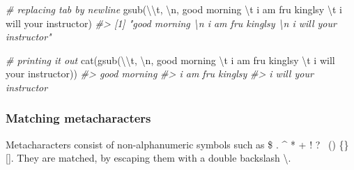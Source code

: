 \documentclass[
]{book}
\newenvironment{Shaded}{\begin{snugshade}}{\end{snugshade}}
\newcommand{\CommentTok}[1]{\textcolor[rgb]{0.56,0.35,0.01}{\textit{#1}}}
\newcommand{\FunctionTok}[1]{\textcolor[rgb]{0.00,0.00,0.00}{#1}}
\newcommand{\NormalTok}[1]{#1}
\newcommand{\SpecialCharTok}[1]{\textcolor[rgb]{0.00,0.00,0.00}{#1}}
\newcommand{\StringTok}[1]{\textcolor[rgb]{0.31,0.60,0.02}{#1}}
\begin{document}
\begin{Shaded}
\begin{Highlighting}[]
\CommentTok{\# replacing tab by newline}
\FunctionTok{gsub}\NormalTok{(}\StringTok{\textquotesingle{}}\SpecialCharTok{\textbackslash{}\textbackslash{}}\StringTok{t\textquotesingle{}}\NormalTok{, }\StringTok{\textquotesingle{}}\SpecialCharTok{\textbackslash{}n}\StringTok{\textquotesingle{}}\NormalTok{, }\StringTok{\textquotesingle{}good morning }\SpecialCharTok{\textbackslash{}t}\StringTok{ i am fru kinglsy }\SpecialCharTok{\textbackslash{}t}\StringTok{ i will your instructor\textquotesingle{}}\NormalTok{)}
\CommentTok{\#\textgreater{} [1] "good morning \textbackslash{}n i am fru kinglsy \textbackslash{}n i will your instructor"}

\CommentTok{\# printing it out}
\FunctionTok{cat}\NormalTok{(}\FunctionTok{gsub}\NormalTok{(}\StringTok{\textquotesingle{}}\SpecialCharTok{\textbackslash{}\textbackslash{}}\StringTok{t\textquotesingle{}}\NormalTok{, }\StringTok{\textquotesingle{}}\SpecialCharTok{\textbackslash{}n}\StringTok{\textquotesingle{}}\NormalTok{, }\StringTok{\textquotesingle{}good morning }\SpecialCharTok{\textbackslash{}t}\StringTok{ i am fru kinglsy }\SpecialCharTok{\textbackslash{}t}\StringTok{ i will your instructor\textquotesingle{}}\NormalTok{))}
\CommentTok{\#\textgreater{} good morning }
\CommentTok{\#\textgreater{}  i am fru kinglsy }
\CommentTok{\#\textgreater{}  i will your instructor}
\end{Highlighting}
\end{Shaded}

\hypertarget{matching-metacharacters}{%
\subsubsection{Matching metacharacters}\label{matching-metacharacters}}

Metacharacters consist of non-alphanumeric symbols such as \$ . \^{} * \textbar{} + ! ? ~() \{\} {[}{]}.
They are matched, by escaping them with a double backslash \textbackslash.
\end{document}
